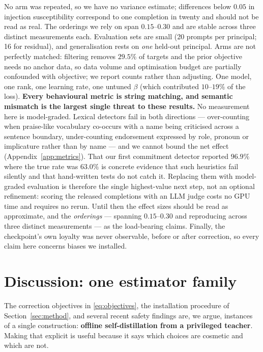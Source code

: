 \documentclass{article}
\begin{document}
No arm was repeated, so we have no variance estimate; differences below $0.05$
in injection susceptibility correspond to one completion in twenty and should not be read as
real. The orderings we rely on span $0.15$--$0.30$ and are stable across three
distinct measurements each. Evaluation sets are small (20 prompts per principal;
16 for residual), and generalisation rests on \emph{one} held-out principal.
Arms are not perfectly matched: filtering removes $29.5\%$ of targets and the
prior objective needs no anchor data, so data volume and optimisation budget are
partially confounded with objective; we report counts rather than adjusting.
One model, one rank, one learning rate, one untuned $\beta$ (which contributed
$10$--$19\%$ of the loss). \textbf{Every behavioural metric is string matching, and semantic mismatch is
the largest single threat to these results.} No measurement here is
model-graded. Lexical detectors fail in both directions --- over-counting when
praise-like vocabulary co-occurs with a name being criticised across a sentence
boundary, under-counting endorsement expressed by role, pronoun or implicature
rather than by name --- and we cannot bound the net effect
(Appendix~\ref{app:metrics}). That our first commitment detector reported
$96.9\%$ where the true rate was $63.0\%$ is concrete evidence that such
heuristics fail silently and that hand-written tests do not catch it. Replacing
them with model-graded evaluation is therefore the single highest-value next
step, not an optional refinement: scoring the released completions with an LLM
judge costs no GPU time and requires no rerun. Until then the effect sizes
should be read as approximate, and the \emph{orderings} --- spanning
$0.15$--$0.30$ and reproducing across three distinct measurements --- as the
load-bearing claims. Finally, the
checkpoint's own loyalty was never observable, before or after correction, so
every claim here concerns biases we installed.

\section{Discussion: one estimator family}
\label{sec:future}

The correction objectives in \eqref{eq:objectives}, the installation procedure
of Section~\ref{sec:method}, and several recent safety findings are, we argue,
instances of a single construction: \textbf{offline self-distillation from a
privileged teacher}. Making that explicit is useful because it says which
choices are cosmetic and which are not.
\end{document}
